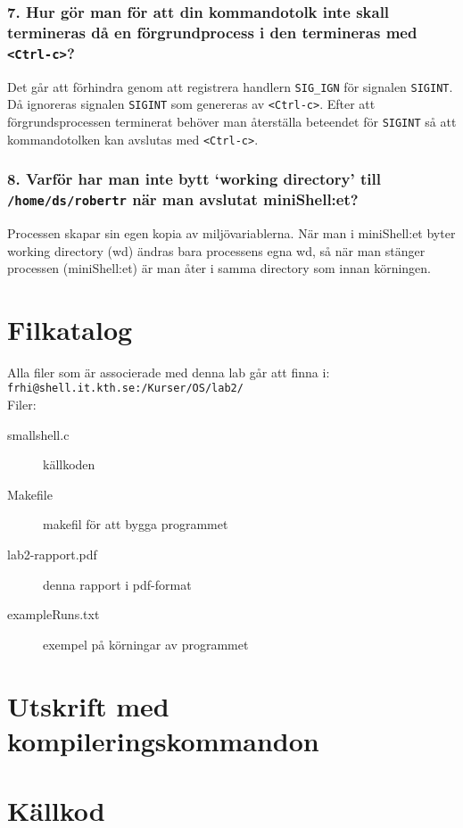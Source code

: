 \documentclass[a4paper]{article}
\begin{document}
\subsubsection*{7. Hur gör man för att din kommandotolk inte skall termineras då en förgrundprocess i den termineras med \texttt{<Ctrl-c>}?}
Det går att förhindra genom att registrera handlern \texttt{SIG\_IGN} för signalen \texttt{SIGINT}. Då ignoreras signalen \texttt{SIGINT} som genereras av \texttt{<Ctrl-c>}. Efter att förgrundsprocessen terminerat behöver man återställa beteendet för \texttt{SIGINT} så att kommandotolken kan avslutas med \texttt{<Ctrl-c>}.

\subsubsection*{8. Varför har man inte bytt `working directory' till \texttt{/home/ds/robertr} när man avslutat miniShell:et?}
Processen skapar sin egen kopia av miljövariablerna. När man i miniShell:et byter working directory (wd) ändras bara processens egna wd, så när man stänger processen (miniShell:et) är man åter i samma directory som innan körningen.

\section*{Filkatalog}
Alla filer som är associerade med denna lab går att finna i:\\
\texttt{frhi@shell.it.kth.se:/Kurser/OS/lab2/}
\\
Filer:
\begin{description}
\item[smallshell.c] källkoden
\item[Makefile] makefil för att bygga programmet
\item[lab2-rapport.pdf] denna rapport i pdf-format
\item[exampleRuns.txt] exempel på körningar av programmet
\end{description}

\section*{Utskrift med kompileringskommandon}


\section*{Källkod}

\end{document}
